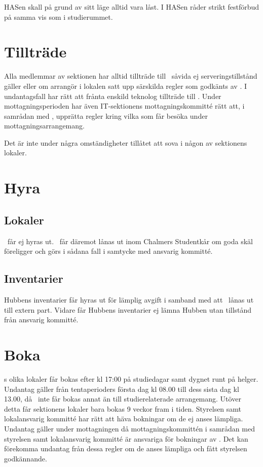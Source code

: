 \documentclass[11pt, includeaddress]{classes/cthit}
\begin{document}
HASen skall på grund av sitt läge alltid vara låst. I HASen råder strikt festförbud på samma vis som i studierummet.

\section{Tillträde}
Alla medlemmar av sektionen har alltid tillträde till \HUBBEN\ såvida ej serveringstillstånd gäller eller
om arrangör i lokalen satt upp särskilda regler som godkänts av \STYRIT. I undantagsfall har \STYRIT{} rätt
att frånta enskild teknolog tillträde till \HUBBEN{}. Under mottagningsperioden har även IT-sektionens mottagningskommitté rätt att, i samrådan med \STYRIT{}, upprätta regler kring vilka som får besöka \HUBBEN{} under mottagningsarrangemang.


Det är inte under några omständigheter tillåtet att sova i någon av sektionens lokaler.


\section{Hyra}
\subsection{Lokaler}
\HUBBEN\ får ej hyras ut. \HUBBEN\ får däremot lånas ut inom Chalmers Studentkår om goda skäl
föreligger och görs i sådana fall i samtycke med ansvarig kommitté.

\subsection{Inventarier}
Hubbens inventarier får hyras ut för lämplig avgift i samband med att \HUBBEN\ lånas ut till extern part.
Vidare får Hubbens inventarier ej lämna Hubben utan tillstånd från ansvarig kommitté.


\section{Boka}
\HUBBEN{}s olika lokaler får bokas efter kl 17:00 på studiedagar samt dygnet runt på
helger. Undantag gäller från tentaperioders första dag kl 08.00 till dess sista dag
kl 13.00, då \HUBBEN\ inte får bokas annat än till studierelaterade arrangemang.
Utöver detta får sektionens lokaler bara bokas 9 veckor fram i tiden. Styrelsen
samt lokalansvarig kommitté har rätt att häva bokningar om de ej anses lämpliga.
Undantag gäller under mottagningen då mottagningskommittén i samrådan med
styrelsen samt lokalansvarig kommitté är ansvariga för bokningar av \HUBBEN{}. Det
kan förekomma undantag från dessa regler om de anses lämpliga och fått styrelsen
godkännande.
\end{document}
